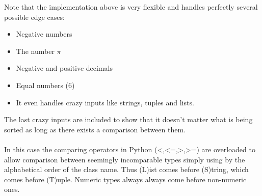 \documentclass{article}
\begin{document}
Note that the implementation above is very flexible and handles perfectly several possible edge cases:
\begin{itemize}
\item Negative numbers
\item The number $\pi$
\item Negative and positive decimals
\item Equal numbers (6)
\item It even handles crazy inputs like strings, tuples and lists.
\end{itemize}
The last crazy inputs are included to show that it doesn't matter what is being sorted as long as there exists a comparison between them. 
\\\\
In this case the comparing operators in Python (<,<=,>,>=) are overloaded to allow comparison between seemingly incomparable types simply using by the alphabetical order of the class name. Thus (L)ist comes before (S)tring, which comes before (T)uple. Numeric types always always come before non-numeric ones.  
\end{document}

